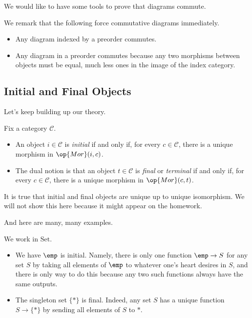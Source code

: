 We would like to have some tools to prove that diagrams commute.
\begin{remark}
	We remark that the following force commutative diagrams immediately.
	\begin{itemize}
		\item Any diagram indexed by a preorder commutes.
		\item Any diagram in a preorder commutes because any two morphisms between objects must be equal, much less ones in the image of the index category.
	\end{itemize}
\end{remark}

\subsection{Initial and Final Objects}
Let's keep building up our theory.
\begin{definition}
	Fix a category $\mathcal C$.
	\begin{itemize}
		\item An object $i\in\mathcal C$ is \textit{initial} if and only if, for every $c\in\mathcal C$, there is a unique morphism in $\op{Mor}(i,c)$.
		\item The dual notion is that an object $t\in\mathcal C$ is \textit{final} or \textit{terminal} if and only if, for every $c\in\mathcal C$, there is a unique morphism in $\op{Mor}(c,t)$.
	\end{itemize}
\end{definition}
\begin{remark}
	It is true that initial and final objects are unique up to unique isomorphism. We will not show this here because it might appear on the homework.
\end{remark}
And here are many, many examples.
\begin{example}
	We work in $\mathrm{Set}$.
	\begin{itemize}
		\item We have $\emp$ is initial. Namely, there is only one function $\emp\to S$ for any set $S$ by taking all elements of $\emp$ to whatever one's heart desires in $S$, and there is only way to do this because any two such functions always have the same outputs.
		\item The singleton set $\{*\}$ is final. Indeed, any set $S$ has a unique function $S\to\{*\}$ by sending all elements of $S$ to $*$.
	\end{itemize}
\end{example}
